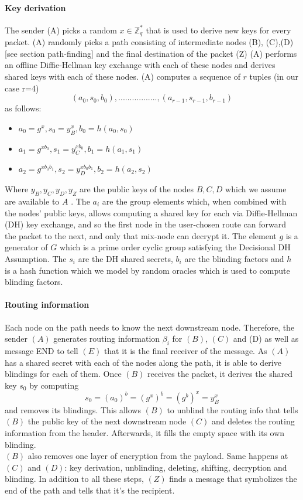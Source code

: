 \paragraph{Key derivation}
The sender (A) picks a random $x\in \mathbb{Z}^*_q$ that is used to derive new keys for every packet. 
\newline (A) randomly picks a path consisting of intermediate nodes (B), (C),(D) [see section path-finding] and the final destination of the packet (Z) 
\newline (A) performs an offline Diffie-Hellman key exchange with each of these nodes and derives shared keys with each of these nodes.
\newline (A) computes a sequence of $r$ tuples (in our case r=4)  $$(a_0,s_0,b_0),.................,(a_{r-1},s_{r-1},b_{r-1})$$ as follows:
\begin{itemize}
\item $a_0=g^x,s_0=y^x_B,b_0=h(a_0,s_0)$
\item $a_1=g^{xb_0},s_1=y^{xb_0}_C,b_1=h(a_1,s_1)$
\item $a_2=g^{xb_0b_1},s_2=y^{xb_0b_1}_D,b_2=h(a_2,s_2)$
\end{itemize}
 Where $y_B,y_C,y_D,y_Z$ are the public keys of the nodes $B,C, D$  which we assume are available to $A$ . The $a_i$ are the group elements which, when combined with the nodes’ public keys, allows computing a shared key for each via Diffie-Hellman (DH) key exchange, 
 and so the first node in the user-chosen route can forward the packet to the next, and only that mix-node can decrypt it.
The element $g$ is a generator of $G$ which is a prime order cyclic group satisfying the Decisional DH Assumption. The $s_i$ are the DH shared secrets, $b_i$ are the blinding factors and $h$ is a hash function which we model by random oracles which is used to compute blinding factors.


\paragraph{Routing information}
Each node on the path needs to know the next downstream node. Therefore, the sender $(A)$ generates routing information $\beta_i$ for $(B)$, $(C)$ and (D) as well as message END to tell $(E)$ that it is the final receiver of the message. 
\newline As $(A)$ has a shared secret with each of the nodes along the path, it is able to derive blindings for each of them.
\newline Once $(B)$ receives the packet, it derives the shared key $s_0$ by computing $$s_0=(a_0)^b=(g^x)^b=(g^b)^x=y^x_B$$ and removes its blindings. This allows $(B)$ to unblind the routing info that tells $(B)$ the public key of the next downstream node $(C)$ and deletes the routing information from the header. Afterwards, it fills the empty space with its own blinding.
\\$(B)$ also removes one layer of encryption from the payload.
Same happens at $(C)$ and $(D)$: key derivation, unblinding, deleting, shifting, decryption and blinding. 
In addition to all these steps, $(Z)$ finds a message that symbolizes the end of the path and tells that it’s the recipient.

